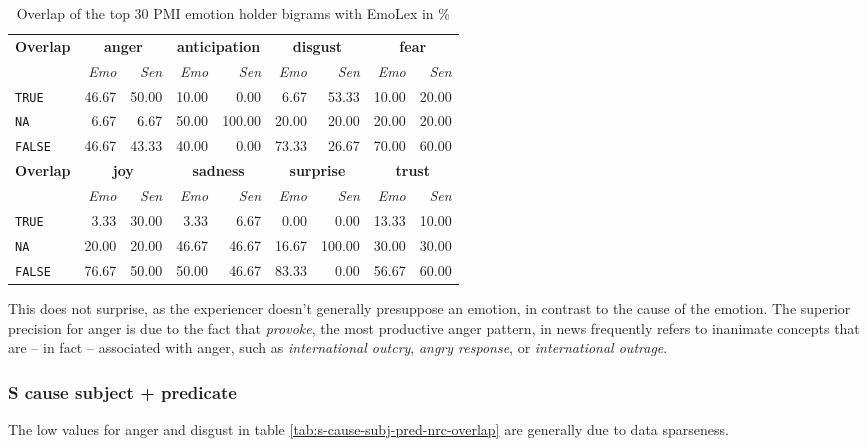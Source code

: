 \begin{table}[]
\centering
\begin{tabular}{l|rr|rr|rr|rr}
{\bf Overlap} & \multicolumn{2}{c}{{\bf anger}} & \multicolumn{2}{c}{{\bf anticipation}} & \multicolumn{2}{c}{{\bf disgust}} & \multicolumn{2}{c}{{\bf fear}} \\
 & {\it Emo} & {\it Sen} & {\it Emo} & {\it Sen} & {\it Emo} & {\it Sen} & {\it Emo} & {\it Sen} \\\hline
\texttt{TRUE} & 46.67 & 50.00 & 10.00 & 0.00 & 6.67 & 53.33 & 10.00 & 20.00 \\
\texttt{NA} & 6.67 & 6.67 & 50.00 & 100.00 & 20.00 & 20.00 & 20.00 & 20.00 \\
\texttt{FALSE} & 46.67 & 43.33 & 40.00 & 0.00 & 73.33 & 26.67 & 70.00 & 60.00 \\
{\bf Overlap} & \multicolumn{2}{c}{{\bf joy}} & \multicolumn{2}{c}{{\bf sadness}} & \multicolumn{2}{c}{{\bf surprise}} & \multicolumn{2}{c}{{\bf trust}} \\
 & {\it Emo} & {\it Sen} & {\it Emo} & {\it Sen} & {\it Emo} & {\it Sen} & {\it Emo} & {\it Sen} \\\hline
\texttt{TRUE} & 3.33 & 30.00 & 3.33 & 6.67 & 0.00 & 0.00 & 13.33 & 10.00 \\
\texttt{NA} & 20.00 & 20.00 & 46.67 & 46.67 & 16.67 & 100.00 & 30.00 & 30.00 \\
\texttt{FALSE} & 76.67 & 50.00 & 50.00 & 46.67 & 83.33 & 0.00 & 56.67 & 60.00
\end{tabular}
\caption{Overlap of the top 30 PMI emotion holder bigrams with EmoLex in \%}
\label{tab:emotion-holder-nrc-overlap}
\end{table}

This does not surprise, as the experiencer doesn't generally presuppose an emotion, in contrast to the cause of the emotion. The superior precision for anger is due to the fact that \textit{provoke}, the most productive anger pattern, in news frequently refers to inanimate concepts that are -- in fact -- associated with anger, such as \textit{international outcry}, \textit{angry response}, or \textit{international outrage}. 

\subsubsection{S cause subject + predicate}

The low values for anger and disgust in table \ref{tab:s-cause-subj-pred-nrc-overlap} are generally due to data sparseness.

